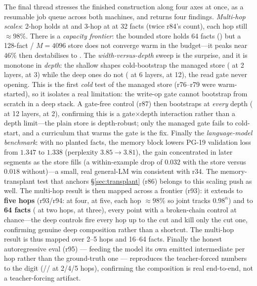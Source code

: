 The final thread stresses the finished construction along four axes at once, as a
resumable job queue across both machines, and returns four findings. \emph{Multi-hop
scales}: 2-hop holds at  and 3-hop at  at 32 facts (twice
r84's count), each hop still $\approx\!98\%$. There is a \emph{capacity frontier}: the
bounded store holds 64 facts () but a 128-fact / $M{=}4096$ store does not
converge warm in the budget---it peaks near $46\%$ then destabilises to . The
\emph{width-versus-depth} sweep is the surprise, and it is monotone in \emph{depth}: the
shallow shapes cold-bootstrap the managed store ( at 2 layers, 
at 3) while the deep ones do not ( at 6 layers,  at 12), the read
gate never opening. This is the first \emph{cold} test of the managed store (r76--r79
were warm-started), so it isolates a real limitation: the write-op gate cannot bootstrap
from scratch in a deep stack. A gate-free control (r87) then bootstraps at \emph{every}
depth ( at 12 layers,  at 2), confirming this is a
gate$\times$depth interaction rather than a depth limit---the plain store is depth-robust;
only the managed gate fails to cold-start, and a curriculum that warms the gate is the fix. Finally the \emph{language-model benchmark}: with no
planted facts, the memory block lowers PG-19 validation loss from $1.347$ to $1.338$
(perplexity $3.85\to3.81$), the gain concentrated in later segments as the store fills
(a within-example drop of $0.032$ with the store versus $0.018$ without)---a small, real
general-LM win consistent with r34. The memory-transplant test that anchors
\S\ref{sec:transplant} (r86) belongs to this scaling push as well. The multi-hop result is
then mapped across a frontier (r93): it extends to \textbf{five hops} (r93/r94:
 at four,  at five, each hop $\approx\!98\%$ so joint tracks
$0.98^n$) and to \textbf{64 facts} ( at two hops,  at three),
every point with a broken-chain control at chance---the deep controls fire every hop up to
the cut and kill only the cut one, confirming genuine deep composition rather than a
shortcut. The multi-hop result is thus mapped over 2--5 hops and 16--64 facts. Finally the honest
autoregressive eval (r95) --- feeding the model its own emitted intermediate per hop rather
than the ground-truth one --- reproduces the teacher-forced numbers to the digit
(// at 2/4/5 hops), confirming the composition is
real end-to-end, not a teacher-forcing artifact.

